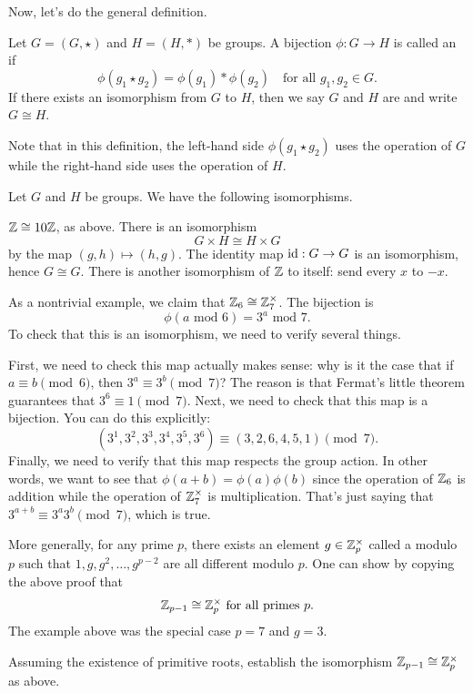 Now, let's do the general definition.
\begin{definition}
	Let $G = (G, \star)$ and $H = (H, \ast)$ be groups.
	A bijection $\phi : G \to H$ is called an  if
	\[ \phi(g_1 \star g_2) = \phi(g_1) \ast \phi(g_2) \quad
		\text{for all $g_1, g_2 \in G$}. \]
	If there exists an isomorphism from $G$ to $H$,
	then we say $G$ and $H$ are  and write $G \cong H$.
\end{definition}
Note that in this definition, the left-hand side $\phi(g_1 \star g_2)$ uses the operation of $G$ while the right-hand side uses the operation of $H$.

\begin{example}
	Let $G$ and $H$ be groups. We have the following isomorphisms.
	\begin{enumerate}[(a)]
		\ii $\mathbb Z \cong 10 \mathbb Z$, as above.
		\ii There is an isomorphism
		\[ G \times H \cong H \times G\]
		by the map $(g,h) \mapsto (h,g)$.
		\ii The identity map $\mathrm{id} : G \to G$
		is an isomorphism, hence $G \cong G$.
		\ii There is another isomorphism of $\mathbb Z$ to itself: send every $x$ to $-x$.
	\end{enumerate}
\end{example}
\begin{example}
	As a nontrivial example, we claim that $\mathbb Z_{6} \cong \mathbb Z_{7}^\times$.
	The bijection is
	\[ \phi(\text{$a$ mod $6$}) = \text{$3^a$ mod $7$}. \]
	To check that this is an isomorphism, we need to verify several things.
	\begin{itemize}
		\ii First, we need to check this map actually makes sense:
		why is it the case that if $a \equiv b \pmod 6$, then $3^a \equiv 3^b \pmod 7$?
		The reason is that Fermat's little theorem guarantees that $3^6 \equiv 1 \pmod 7$.
		\ii Next, we need to check that this map is a bijection.
		You can do this explicitly:
		\[ (3^1, 3^2, 3^3, 3^4, 3^5, 3^6)
			\equiv (3,2,6,4,5,1) \pmod 7. \]
		\ii Finally, we need to verify that this map respects the group action.
		In other words, we want to see that
		$\phi(a+b) = \phi(a) \phi(b)$
		since the operation of $\mathbb Z_{6}$ is addition
		while the operation of $\mathbb Z_{7}^\times$ is multiplication.
		That's just saying that $3^{a+b} \equiv 3^a 3^b \pmod 7$,
		which is true.
	\end{itemize}
\end{example}
\begin{example}
	More generally, for any prime $p$, there exists
	an element $g \in \mathbb Z_{p}^\times$ called a  modulo $p$
	such that $1, g, g^2, \dots, g^{p-2}$ are all different modulo $p$.
	One can show by copying the above proof that
	\[ \mathbb Z_{p-1} \cong \mathbb Z_{p}^\times \text{ for all primes $p$}. \]
	The example above was the special case $p=7$ and $g=3$.
\end{example}
\begin{exercise}
	Assuming the existence of primitive roots,
	establish the isomorphism $\mathbb Z_{p-1} \cong \mathbb Z_{p}^\times$ as above.
\end{exercise}

